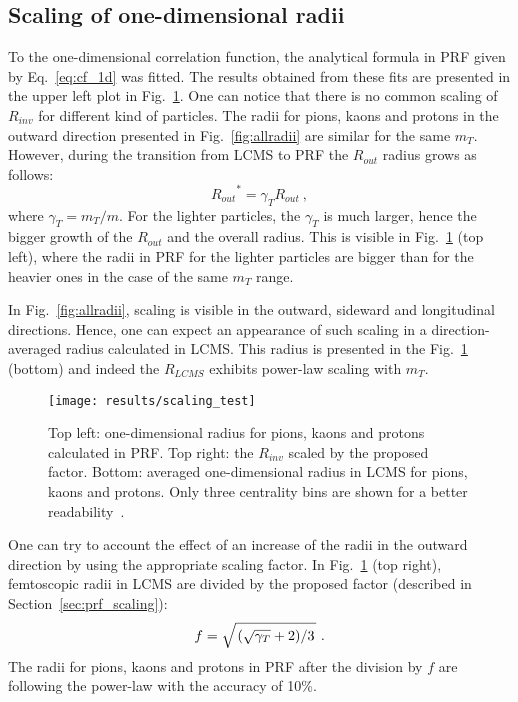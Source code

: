       \subsection{Scaling of one-dimensional radii}
      To the one-dimensional correlation function, the analytical formula in PRF given by Eq.~\ref{eq:cf_1d} was fitted.
      The results obtained from these fits are presented in the upper left plot in Fig.~\ref{fig:scaling_test}.
      One can notice that there is no common scaling of $R_{inv}$ for different kind of particles.
      The radii for pions, kaons and protons in the outward direction presented in Fig.~\ref{fig:allradii} are similar for the same $m_T$.
      However, during the transition from LCMS to PRF the $R_{out}$ radius grows as follows:
      \begin{equation}
        {R_{out}}^{*} = \gamma_T R_{out}~,
      \end{equation}
      where $\gamma_T = m_T / m$.
      For the lighter particles, the $\gamma_T$ is much larger, hence the bigger growth of the $R_{out}$ and the overall radius.
      This is visible in Fig.~\ref{fig:scaling_test} (top left), where the radii in PRF for the lighter particles are bigger than for the heavier ones in the case of the same $m_T$ range.

      In Fig.~\ref{fig:allradii}, scaling is visible in the outward, sideward and longitudinal directions.
      Hence, one can expect an appearance of such scaling in a direction-averaged radius calculated in LCMS.
      This radius is presented in the Fig.~\ref{fig:scaling_test} (bottom) and indeed the $R_{LCMS}$ exhibits power-law scaling with $m_T$.

      \begin{figure}[b]
        \centering
        \centerline{\texttt{[image: results/scaling\_test]}}
        \caption{Top left: one-dimensional radius for pions, kaons and protons calculated in PRF. Top right: the $R_{inv}$ scaled by the proposed factor. Bottom: averaged one-dimensional radius in LCMS for pions, kaons and protons. Only three centrality bins are shown for a better readability~\cite{galazyn}.}
      \label{fig:scaling_test}
      \end{figure}

      One can try to account the effect of an increase of the radii in the outward direction by using the appropriate scaling factor.
      In Fig.~\ref{fig:scaling_test} (top right), femtoscopic radii in LCMS are divided by the proposed factor (described in Section~\ref{sec:prf_scaling}):
      \begin{equation}
        f = \sqrt{ \left. \left( \sqrt{\gamma_T} + 2 \right) \middle/ 3 \right. }~.
      \end{equation}
      The radii for pions, kaons and protons in PRF after the division by $f$ are following the power-law with the accuracy of 10\%.

